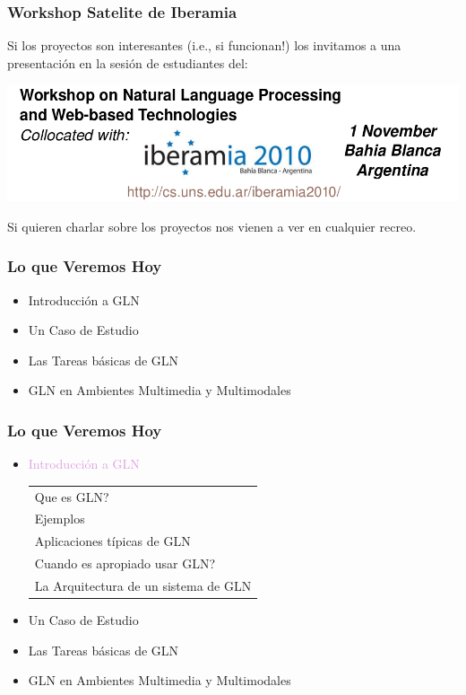 \documentclass[compress,color=usenames]{beamer}
\newcommand{\mH}[1]{\textcolor{Plum}{#1}}
\begin{document}
\begin{frame}
\frametitle{Workshop Satelite de Iberamia}

Si los proyectos son interesantes (i.e., si funcionan!) los invitamos a una presentaci\'on 
en la sesi\'on de estudiantes  del:

\begin{center}
\includegraphics[scale=.4]{pics/pic15.jpg}
\end{center}

Si quieren charlar sobre los proyectos nos vienen a ver en cualquier recreo. 

\end{frame}

\begin{frame}
\frametitle{Lo que Veremos Hoy}

\begin{itemize}
\item  Introducci\'on a GLN 
\item  Un Caso de Estudio
\item  Las Tareas b\'asicas de GLN
\item  GLN en Ambientes Multimedia y Multimodales
\end{itemize}
\end{frame}

\begin{frame}
\frametitle{Lo que Veremos Hoy}

\begin{itemize}
\item  \mH{Introducci\'on a GLN} 
\begin{tabular}{|l}
 {\small Que es GLN?}\\
 {\small Ejemplos}\\
 {\small Aplicaciones t\'ipicas de GLN}\\
 {\small Cuando es apropiado usar GLN?}\\
 {\small La Arquitectura de un sistema de GLN}
\end{tabular}

\item  Un Caso de Estudio
\item  Las Tareas b\'asicas de GLN
\item  GLN en Ambientes Multimedia y Multimodales
\end{itemize}
\end{frame}
\end{document}
